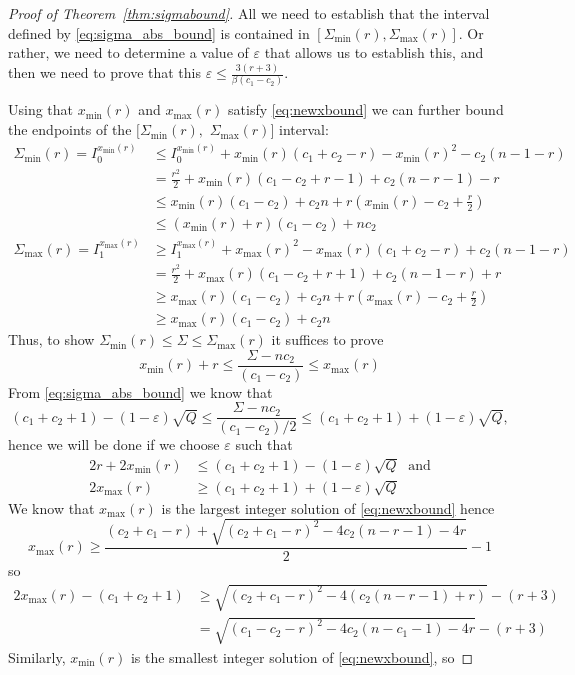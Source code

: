 \documentclass[11pt]{elsarticle}
\theoremstyle{plain}
\theoremstyle{definition}
\newcommand{\ep}{\varepsilon}
\newcommand{\Smax}[1][r]{\Sigma_{\max}(#1)}
\newcommand{\amax}[1][r]{x_{\max}(#1)}
\newcommand{\Smin}[1][r]{\Sigma_{\min}(#1)}
\newcommand{\amin}[1][r]{x_{\min}(#1)}
\begin{document}
\begin{proof}[Proof of Theorem~\ref{thm:sigmabound}] All we need to establish that the interval defined by \eqref{eq:sigma_abs_bound} is contained in $[\Smin,\Smax]$. Or rather, we need to determine a value of $\ep$ that allows us to establish this, and then we need to prove that this $\ep \leq \frac{3(r+3)}{\beta(c_1-c_2)}$.


Using that $\amin$ and $\amax$ satisfy \eqref{eq:newxbound} we can further bound the endpoints of the $[\Smin,$ $\Smax]$ interval:
\begin{align}\nonumber
\Smin = I^{\amin}_0 &\leq I^{\amin}_0 + \amin(c_1+c_2-r)-\amin^2-c_2(n-1-r) \\ \nonumber
    &=\frac{r^2}{2}+ \amin(c_1-c_2+r-1)+c_2(n-r-1) -r\\\nonumber
    &\leq \amin(c_1-c_2) +c_2 n + r\left(\amin - c_2 + \frac{r}{2} \right) \\ \label{eq:sminlower}  &\leq (\amin+r)(c_1-c_2) + nc_2 \\
\nonumber
\Smax =I^{\amax}_1 &\geq I^{\amax}_1 + \amax^2-\amax(c_1+c_2-r) + c_2(n-1-r) \\ \nonumber
    &=\frac{r^2}{2} + \amax(c_1-c_2+r+1)+c_2(n-1-r)+r \\ \nonumber
    &\geq \amax(c_1 - c_2) + c_2 n + r\left(\amax - c_2 + \frac{r}{2} \right)\\ \label{eq:smaxlower}
    &\geq \amax(c_1 - c_2) + c_2 n
\end{align}
Thus, to show $\Smin \leq \Sigma \leq \Smax$ it suffices to prove
\[ \amin +r \leq \frac{\Sigma - n c_2}{(c_1-c_2) } \leq \amax \]
From \eqref{eq:sigma_abs_bound} we know that
\[ (c_1+c_2+1) - (1-\varepsilon)\sqrt{Q} \leq \frac{\Sigma-nc_2}{(c_1-c_2)/2} \leq (c_1+c_2+1)+(1-\ep)\sqrt{Q},\] hence we will be done if we choose $\ep$ such that
\begin{align*}
2r+2\amin&\leq(c_1+c_2+1)-(1-\ep)\sqrt{Q} \;\mbox{ and}\\
2\amax &\geq (c_1+c_2+1)+(1-\ep)\sqrt{Q}
\end{align*}
We know that \(\amax\) is the largest integer solution of \eqref{eq:newxbound} hence
\[\amax \geq \frac{(c_2+c_1-r)+\sqrt{(c_2+c_1-r)^2-4c_2(n-r-1)-4r}}{2} - 1\] so
\begin{align*}
     2\amax - (c_1+c_2+1) &\geq \sqrt{(c_2+c_1-r)^2-4(c_2(n-r-1)+r)} - (r+3)\\
     &= \sqrt{ (c_1-c_2 -r)^2 - 4c_2(n-c_1-1)-4r} - (r+3)
\end{align*}
Similarly, $\amin$ is the smallest integer solution of \eqref{eq:newxbound}, so

\end{proof}
\end{document}
